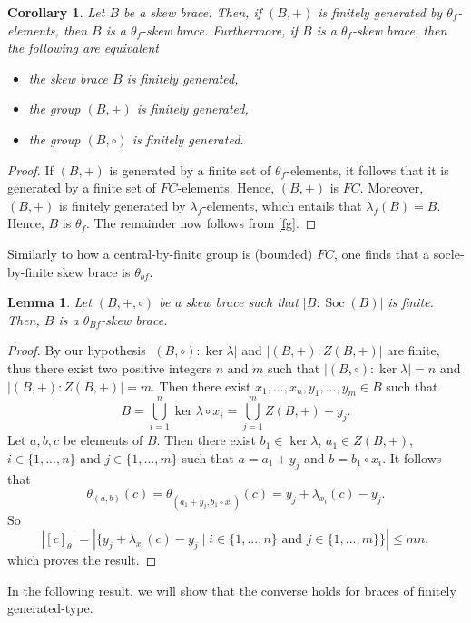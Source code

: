 \documentclass{amsart}
\newcommand{\Soc}{\operatorname{Soc}}
\newtheorem{lem}[thm]{Lemma}
\newtheorem{cor}[thm]{Corollary}
\begin{document}
\begin{cor}\label{fgtheta}
    Let $B$ be a skew brace. Then, if $(B,+)$ is finitely generated by $\theta_f$-elements, then $B$ is a $\theta_f$-skew brace. Furthermore, if $B$ is a $\theta_f$-skew brace, then the following are equivalent \begin{itemize}
        \item the skew brace $B$ is finitely generated,
        \item the group $(B,+)$ is finitely generated,
        \item the group $(B,\circ)$ is finitely generated.
    \end{itemize}
\end{cor}
\begin{proof}
    If $(B,+)$ is generated by a finite set of $\theta_f$-elements, it follows that it is generated by a finite set of $FC$-elements. Hence, $(B,+)$ is $FC$. Moreover, $(B,+)$ is finitely generated by $\lambda_f$-elements, which entails that $\lambda_f(B)=B$. Hence, $B$ is $\theta_f$. The remainder now follows from \cref{fg}.
\end{proof}

Similarly to how a central-by-finite group is (bounded) $FC$, one finds that a socle-by-finite skew brace is $\theta_{bf}$.   


\begin{lem}\label{oversocfinite}
    Let $(B,+,\circ)$ be a skew brace such that $|B:\Soc(B)|$ is finite. Then, $B$ is a $\theta_{Bf}$-skew brace.
\end{lem}

\begin{proof}
    By our hypothesis $|(B,\circ):\ker\lambda|$ and $|(B,+):Z(B,+)|$ are finite, thus there exist two positive integers $n$ and $m$ such that $|(B,\circ):\ker\lambda|=n$ and $|(B,+):Z(B,+)|=m$. Then there exist $x_1,...,x_n,y_1,...,y_m\in B$ such that $$B=\bigcup_{i=1}^n\ker\lambda\circ x_i=\bigcup_{j=1}^mZ(B,+)+y_j.$$ Let $a,b,c$ be elements of $B$. Then there exist $b_1\in\ker\lambda$, $a_1\in Z(B,+)$, $i\in\{1,...,n\}$ and $j\in\{1,...,m\}$ such that $a=a_1+y_j$ and $b=b_1\circ x_i$. It follows that 
    $$\theta_{(a,b)}(c)=\theta_{(a_1+y_j,b_1\circ x_i)}(c)=y_j+\lambda_{x_i}(c)-y_j.$$ 
    So 
    \[ |[c]_\theta|=|\{y_j+\lambda_{x_i}(c)-y_j\mid i\in\{1,...,n\}\text{ and }j\in\{1,...,m\}\}|\leq mn,
    \]
   which proves the result.
\end{proof}


In the following result, we will show that the converse holds for braces of finitely generated-type.
\end{document}
